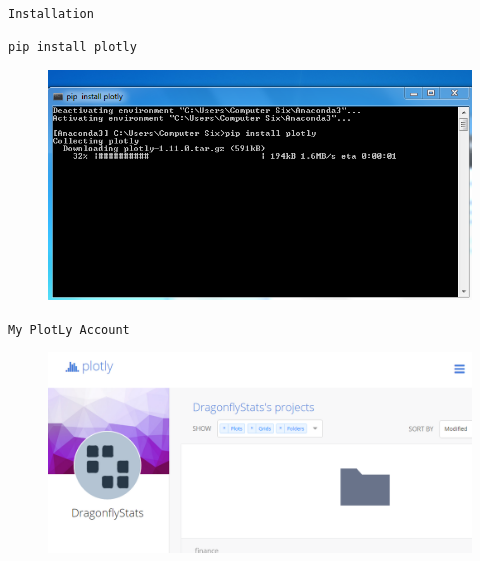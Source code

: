 \documentclass{beamer}
\begin{document}
\begin{frame}[fragile]
	\large
\texttt{Installation}
\begin{framed}
\begin{verbatim}
pip install plotly
\end{verbatim}
\end{framed}
	\begin{figure}
\centering
\includegraphics[width=0.95\linewidth]{pipinstallplotly}

\end{figure}

\end{frame}
\begin{frame}
\large
\texttt{My PlotLy Account}
\begin{figure}
\centering
\includegraphics[width=01.1\linewidth]{plotlyprofile}
\end{figure}

\end{frame}
\end{document}
